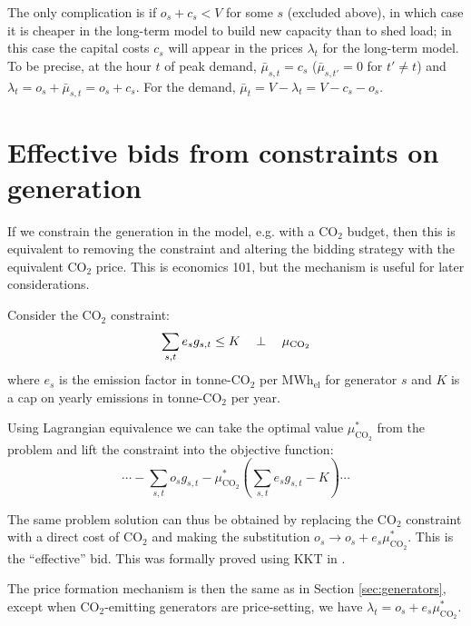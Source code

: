 \documentclass[final,3p,times]{elsarticle}
\def\el{${}_{\textrm{el}}$}
\def\l{\lambda}
\begin{document}
The only complication is if $o_s + c_s < V$ for some $s$ (excluded
above), in which case it is cheaper in the long-term model to build
new capacity than to shed load; in this case the capital costs $c_s$
will appear in the prices $\l_t$ for the long-term model. To be precise, at the hour $t$ of
peak demand, $\bar{\mu}_{s,t} = c_s$ ($\bar{\mu}_{s,t'} =0$ for $t'
\neq t$) and $\l_t = o_s + \bar{\mu}_{s,t} = o_s + c_s$. For the demand, $\bar{\mu}_{t} = V - \l_t = V - c_s - o_s$.





\section{Effective bids from constraints on generation}\label{sec:effective}


If we constrain the generation in the model, e.g. with a CO$_2$ budget, then this is equivalent to removing the constraint and altering the bidding strategy with the equivalent CO$_2$ price. This is economics 101, but the mechanism is useful for later considerations.

Consider the CO$_2$ constraint:
\begin{equation}
  \sum_{s,t} e_s g_{s,t} \leq K \hspace{0.34cm}\perp \hspace{0.34cm} \mu_{\textrm{CO}_2} \label{eq:co2}
\end{equation}
where $e_s$ is the emission factor in tonne-CO$_2$ per MWh\el{} for
generator $s$ and $K$ is a cap on yearly emissions in tonne-CO$_2$ per
year.

Using Lagrangian equivalence we can take the optimal value $\mu^*_{\textrm{CO}_2}$ from the problem and lift the constraint into the objective function:
\begin{equation}
  \cdots -\sum_{s,t} o_s g_{s,t}   - \mu^*_{\textrm{CO}_2} \left(\sum_{s,t} e_s g_{s,t} - K \right) \cdots
\end{equation}


The same problem solution can thus be obtained by replacing the CO$_2$ constraint with a direct cost of CO$_2$ and making the substitution $o_s \to o_s + e_s \mu^*_{\textrm{CO}_2}$. This is the ``effective'' bid. This was formally proved using KKT in \cite{Brown2020}.

The price formation mechanism is then the same as in Section \ref{sec:generators}, except when CO$_2$-emitting generators are price-setting, we have $\l_t = o_s + e_s \mu^*_{\textrm{CO}_2}$.
\end{document}
